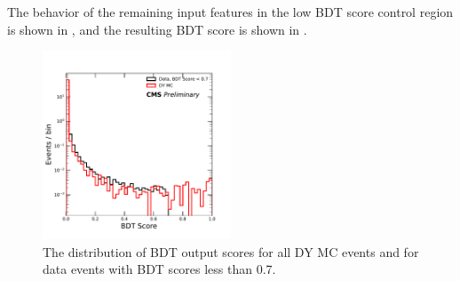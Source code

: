The behavior of the remaining input features in the low BDT score control region is shown in , and the resulting BDT score is shown in .

\begin{figure}[htbp]
	\label{fig:BDTlowvalid}
	\centering
	\includegraphics[width=0.5\textwidth]{figures/partialBDTScore.pdf}
        \caption[Low BDT Score Validation]{The distribution of BDT output scores for all DY MC events and for data events with BDT scores less than 0.7.}
\end{figure}

